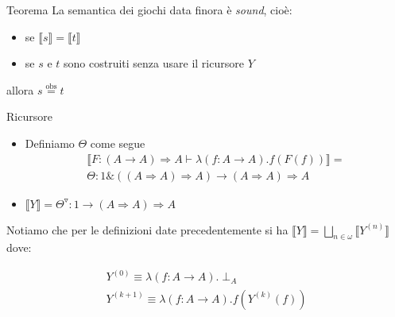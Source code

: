 \documentclass{beamer}
\newcommand{\eqobs}{\stackrel{\text{obs}}{=}}
\begin{document}
\begin{frame}
	
	\begin{block}{Teorema}
		La semantica dei giochi data finora è \emph{sound}, cioè:
		\begin{itemize}
			\item se $\llbracket s \rrbracket = 
	\llbracket t \rrbracket$
			\item se $s$ e $t$ sono costruiti senza usare il ricursore $Y$
		\end{itemize}
  allora $s \eqobs t$
	\end{block}

	
\end{frame}

\begin{frame}
	
	\begin{block}{Ricursore}
	
		\begin{itemize}
			\item Definiamo $\Theta$ come segue
			\begin{gather*}
				\llbracket F: (A \rightarrow A) \Rightarrow A \vdash \lambda (f : A \rightarrow A).f(F(f)) \rrbracket = \\
				\Theta:1\&((A\Rightarrow A) \Rightarrow A) \rightarrow (A\Rightarrow A) \Rightarrow A
			\end{gather*}
			\item $\llbracket Y \rrbracket = \Theta ^\triangledown : 1 \rightarrow (A\Rightarrow A) \Rightarrow A$
		\end{itemize}
		
	\end{block}
	
	Notiamo che per le definizioni date precedentemente si ha $\llbracket Y \rrbracket = \bigsqcup_{n\in \omega} \llbracket Y^{(n)} \rrbracket$ dove:
	
	\begin{gather*}
		Y^{(0)} \equiv \lambda(f: A \rightarrow A).\perp_A \\
		Y^{(k+1)} \equiv \lambda(f : A\rightarrow A).f(Y^{(k)}(f))
	\end{gather*}


	
\end{frame}
\end{document}
